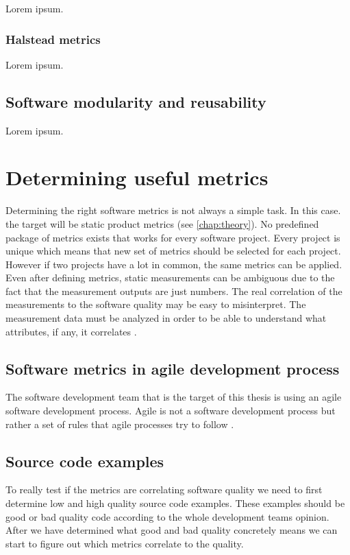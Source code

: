 Lorem ipsum.

\subsection{Halstead metrics}

Lorem ipsum.

\section{Software modularity and reusability}

Lorem ipsum.



\chapter{Determining useful metrics}

Determining the right software metrics is not always a simple task. In this case. the target will be static product metrics (see \autoref{chap:theory}). No predefined package of metrics exists that works for every software project. Every project is unique which means that new set of metrics should be selected for each project. However if two projects have a lot in common, the same metrics can be applied. Even after defining metrics, static measurements can be ambiguous due to the fact that the measurement outputs are just numbers. The real correlation of the measurements to the software quality may be easy to misinterpret. The measurement data must be analyzed in order to be able to understand what attributes, if any, it correlates \cite{sommerville2011software}. 

\section{Software metrics in agile development process}

The software development team that is the target of this thesis is using an agile software development process. Agile is not a software development process but rather a set of rules that agile processes try to follow \cite{agilemanifesto}.

\section{Source code examples}
To really test if the metrics are correlating software quality we need to first determine low and high quality source code examples. These examples should be good or bad quality code according to the whole development teams opinion. After we have determined what good and bad quality concretely means we can start to figure out which metrics correlate to the quality. 

